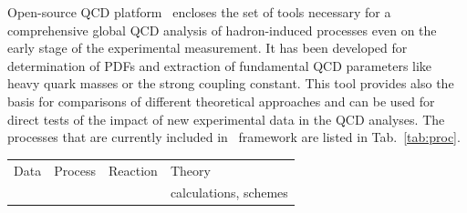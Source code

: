 %
Open-source QCD platform \fitter\ encloses the set of tools  necessary for a comprehensive global 
QCD analysis of hadron-induced processes even on the early stage of the experimental measurement. 
It has been developed for determination of PDFs and extraction of fundamental QCD parameters like heavy
quark masses or the strong coupling constant. This tool provides also the basis for 
comparisons of different theoretical approaches and can be used for direct tests of the impact 
of new experimental data in the QCD analyses.
%
The processes that are currently included in \fitter~framework are listed in Tab.~\ref{tab:proc}.
%
\begin{table}
\small
\scriptsize

\begin{tabular}{|l|l|l|l|}
\hline
Data &Process &  Reaction & Theory      \\
        &     &           & calculations, schemes \\
\hline


\end{tabular}
\end{table}
